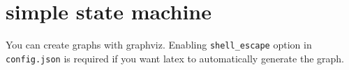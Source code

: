 


\section{simple state machine}
\label{sec:org707b78a}

You can create graphs with graphviz.
Enabling \texttt{shell\_escape} option in \texttt{config.json} is required if you want latex
to automatically generate the graph.



